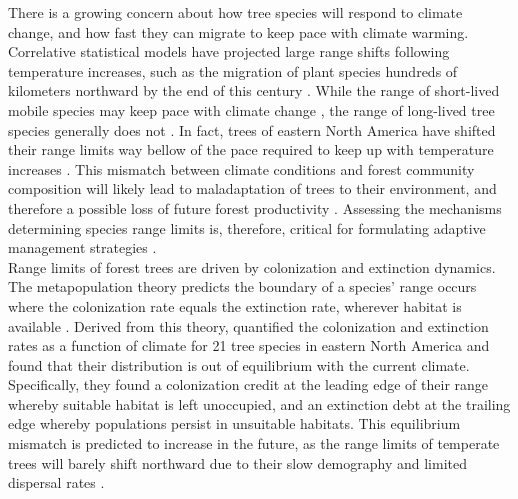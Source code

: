 There is a growing concern about how tree species will respond to
climate change, and how fast they can migrate to keep pace with climate
warming. Correlative statistical models have projected large range
shifts following temperature increases, such as the migration of plant
species hundreds of kilometers northward by the end of this century
\citep{Malcolm2002, Mckenney2007}. While the range of short-lived mobile
species may keep pace with climate change \citep{Chen2011}, the range of
long-lived tree species generally does not \citep{Harsch2009, Zhu2012}.
In fact, trees of eastern North America have shifted their range limits
way bellow of the pace required to keep up with temperature increases
\citep{BoisvertMarsh2014, BoisvertMarsh2019, Sittaro2017}. This mismatch
between climate conditions and forest community composition will likely
lead to maladaptation of trees to their environment, and therefore a
possible loss of future forest productivity \citep{Aitken2008}.
Assessing the mechanisms determining species range limits is, therefore,
critical for formulating adaptive management strategies
\citep{Becknell2015a}.\\

Range limits of forest trees are driven by colonization and extinction
dynamics. The metapopulation theory predicts the boundary of a species'
range occurs where the colonization rate equals the extinction rate,
wherever habitat is available \citep{Holt2000}. Derived from this
theory, \citet{Talluto2017} quantified the colonization and extinction
rates as a function of climate for 21 tree species in eastern North
America and found that their distribution is out of equilibrium with the
current climate. Specifically, they found a colonization credit at the
leading edge of their range whereby suitable habitat is left unoccupied,
and an extinction debt at the trailing edge whereby populations persist
in unsuitable habitats. This equilibrium mismatch is predicted to
increase in the future, as the range limits of temperate trees will
barely shift northward due to their slow demography and limited
dispersal rates \citep{Vissault2020}.\\

